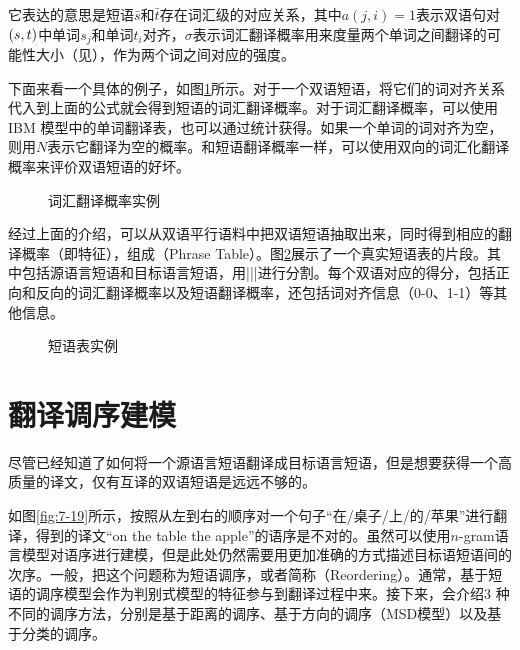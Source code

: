 \parinterval 它表达的意思是短语$\bar{s}$和$\bar{t}$存在词汇级的对应关系，其中$a(j,i)=1$表示双语句对$({s},{t})$中单词$s_j$和单词$t_i$对齐，$\sigma $表示词汇翻译概率用来度量两个单词之间翻译的可能性大小（见{\chapterfive}），作为两个词之间对应的强度。

\parinterval 下面来看一个具体的例子，如图\ref{fig:7-17}所示。对于一个双语短语，将它们的词对齐关系代入到上面的公式就会得到短语的词汇翻译概率。对于词汇翻译概率，可以使用IBM 模型中的单词翻译表，也可以通过统计获得。如果一个单词的词对齐为空，则用$N$表示它翻译为空的概率。和短语翻译概率一样，可以使用双向的词汇化翻译概率来评价双语短语的好坏。

\begin{figure}[htp]
\centering

\caption{词汇翻译概率实例}
\label{fig:7-17}
\end{figure}

\parinterval 经过上面的介绍，可以从双语平行语料中把双语短语抽取出来，同时得到相应的翻译概率（即特征），组成{\small{}}（Phrase Table）。图\ref{fig:7-18}展示了一个真实短语表的片段。其中包括源语言短语和目标语言短语，用|||进行分割。每个双语对应的得分，包括正向和反向的词汇翻译概率以及短语翻译概率，还包括词对齐信息（0-0、1-1）等其他信息。

\begin{figure}[htp]
\centering

\caption{短语表实例}
\label{fig:7-18}
\end{figure}

\sectionnewpage
\section{翻译调序建模}\label{subsection-7.4}

\parinterval 尽管已经知道了如何将一个源语言短语翻译成目标语言短语，但是想要获得一个高质量的译文，仅有互译的双语短语是远远不够的。

\parinterval 如图\ref{fig:7-19}所示，按照从左到右的顺序对一个句子“在/桌子/上/的/苹果”进行翻译，得到的译文“on the table the apple”的语序是不对的。虽然可以使用$n$-gram语言模型对语序进行建模，但是此处仍然需要用更加准确的方式描述目标语短语间的次序。一般，把这个问题称为短语调序，或者简称{\small{}}（Reordering）。通常，基于短语的调序模型会作为判别式模型的特征参与到翻译过程中来。接下来，会介绍3 种不同的调序方法，分别是基于距离的调序、基于方向的调序（MSD模型）以及基于分类的调序。

